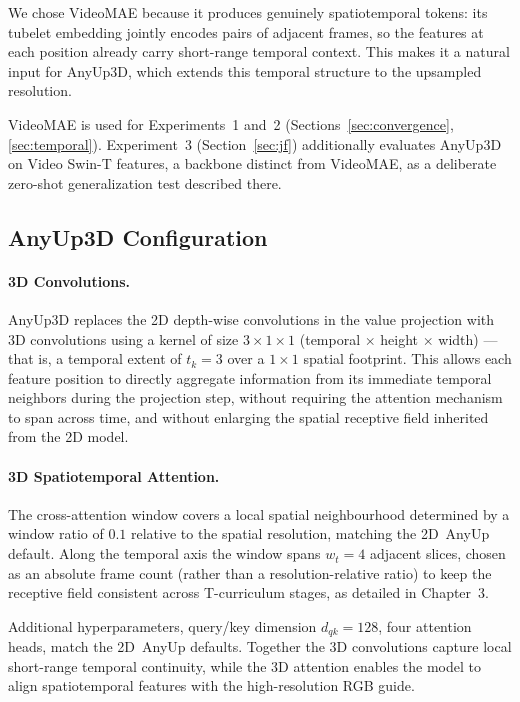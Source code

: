 We chose VideoMAE because it produces genuinely spatiotemporal tokens: its tubelet embedding jointly encodes pairs of adjacent frames, so the features at each position already carry short-range temporal context.
This makes it a natural input for AnyUp3D, which extends this temporal structure to the upsampled resolution.

VideoMAE is used for Experiments~1 and~2 (Sections~\ref{sec:convergence}, \ref{sec:temporal}).
Experiment~3 (Section~\ref{sec:jf}) additionally evaluates AnyUp3D on Video Swin-T features, a backbone distinct from VideoMAE, as a deliberate zero-shot generalization test described there.

\subsection{AnyUp3D Configuration}

\paragraph{3D Convolutions.}
AnyUp3D replaces the 2D depth-wise convolutions in the value projection with 3D convolutions using a kernel of size $3 \times 1 \times 1$ (temporal $\times$ height $\times$ width) --- that is, a temporal extent of $t_k = 3$ over a $1 \times 1$ spatial footprint.
This allows each feature position to directly aggregate information from its immediate temporal neighbors during the projection step, without requiring the attention mechanism to span across time, and without enlarging the spatial receptive field inherited from the 2D model.

\paragraph{3D Spatiotemporal Attention.}
The cross-attention window covers a local spatial neighbourhood determined by a window ratio of $0.1$ relative to the spatial resolution, matching the 2D~AnyUp default.
Along the temporal axis the window spans $w_t = 4$ adjacent slices, chosen as an absolute frame count (rather than a resolution-relative ratio) to keep the receptive field consistent across T-curriculum stages, as detailed in Chapter~3.

Additional hyperparameters, query/key dimension $d_{qk} = 128$, four attention heads, match the 2D~AnyUp defaults.
Together the 3D convolutions capture local short-range temporal continuity, while the 3D attention enables the model to align spatiotemporal features with the high-resolution RGB guide.

